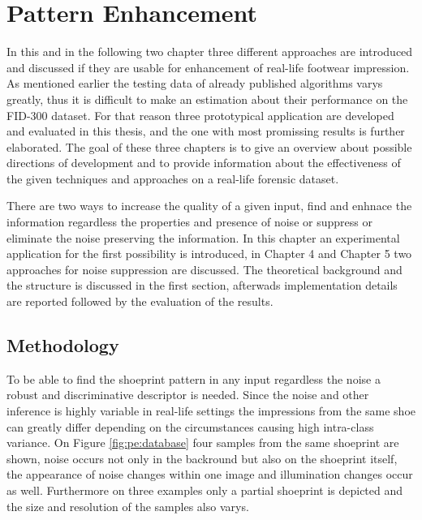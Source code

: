 \documentclass[draft,final]{vutinfth} %
\begin{document}
\chapter{Pattern Enhancement}
\par
In this and in the following two chapter three different approaches are introduced and discussed if they are usable for enhancement of real-life footwear impression.
As mentioned earlier the testing data of already published algorithms varys greatly, thus it is difficult to make an estimation about their performance on the FID-300  \cite{kortylewski2014unsupervised} dataset.
For that reason three prototypical application are developed and evaluated in this thesis, and the one with most promissing results is further elaborated.
The goal of these three chapters is to give an overview about possible directions of development and to provide information about the effectiveness of the given techniques and approaches on a real-life forensic dataset.
\par
There are two ways to increase the quality of a given input, find and enhnace the information regardless the properties and presence of noise or suppress or eliminate the noise preserving the information.
In this chapter an experimental application for the first possibility is introduced, in Chapter 4 and Chapter 5 two approaches for noise suppression are discussed.
The theoretical background and the structure is discussed in the first section, afterwads implementation details are reported followed by the evaluation of the results.

\section{Methodology}
\par
To be able to find the shoeprint pattern in any input regardless the noise a robust and discriminative descriptor is needed.
Since the noise and other inference is highly variable in real-life settings the impressions from the same shoe can greatly differ depending on the circumstances causing high intra-class variance.
On Figure \ref{fig:pe:database} four samples from the same shoeprint are shown, noise occurs not only in the backround but also on the shoeprint itself, the appearance of noise changes within one image and illumination changes occur as well.
Furthermore on three examples only a partial shoeprint is depicted and the size and resolution of the samples also varys.
\end{document}
